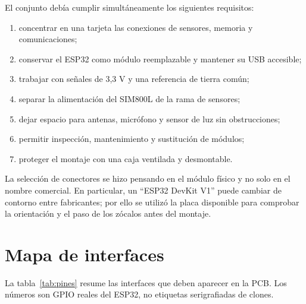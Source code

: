 \documentclass[11pt,a4paper,oneside]{report}
\begin{document}
El conjunto debía cumplir simultáneamente los siguientes requisitos:

\begin{enumerate}
  \item concentrar en una tarjeta las conexiones de sensores, memoria y
        comunicaciones;
  \item conservar el ESP32 como módulo reemplazable y mantener su USB accesible;
  \item trabajar con señales de 3,3 V y una referencia de tierra común;
  \item separar la alimentación del SIM800L de la rama de sensores;
  \item dejar espacio para antenas, micrófono y sensor de luz sin obstrucciones;
  \item permitir inspección, mantenimiento y sustitución de módulos;
  \item proteger el montaje con una caja ventilada y desmontable.
\end{enumerate}

La selección de conectores se hizo pensando en el módulo físico y no solo en el
nombre comercial. En particular, un ``ESP32 DevKit V1'' puede cambiar de contorno
entre fabricantes; por ello se utilizó la placa disponible para comprobar la
orientación y el paso de los zócalos antes del montaje.

\section{Mapa de interfaces}

La tabla~\ref{tab:pines} resume las interfaces que deben aparecer en la PCB. Los
números son GPIO reales del ESP32, no etiquetas serigrafiadas de clones.
\end{document}
